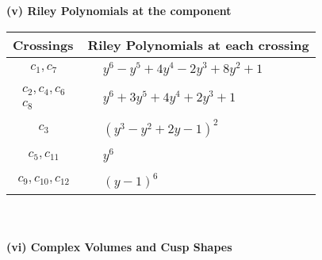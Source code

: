 \documentclass[1p]{elsarticle_modified}
\theoremstyle{definition}
\begin{document}
\newpage\renewcommand{\arraystretch}{1}
\flushleft \textbf{(v) Riley Polynomials at the component}\newline \\
\begin{tabular}{m{50pt}|m{274pt}}
Crossings & \hspace{64pt}Riley Polynomials at each crossing \\
\hline $$\begin{aligned}c_{1},c_{7}\end{aligned}$$&$\begin{aligned}
&y^6- y^5+4 y^4-2 y^3+8 y^2+1
\end{aligned}$\\
\hline $$\begin{aligned}c_{2},c_{4},c_{6}\\c_{8}\end{aligned}$$&$\begin{aligned}
&y^6+3 y^5+4 y^4+2 y^3+1
\end{aligned}$\\
\hline $$\begin{aligned}c_{3}\end{aligned}$$&$\begin{aligned}
&(y^3- y^2+2 y-1)^2
\end{aligned}$\\
\hline $$\begin{aligned}c_{5},c_{11}\end{aligned}$$&$\begin{aligned}
&y^6
\end{aligned}$\\
\hline $$\begin{aligned}c_{9},c_{10},c_{12}\end{aligned}$$&$\begin{aligned}
&(y-1)^6
\end{aligned}$\\
\hline
\end{tabular}\\~\\
\newpage\flushleft \textbf{(vi) Complex Volumes and Cusp Shapes}
\end{document}
